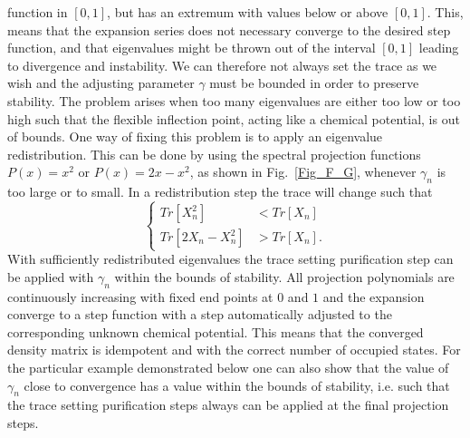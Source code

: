 \commentoutA{\documentclass[superbib,aps,prb,epsfig,floats,twocolumn]{revtex4}}
\begin{document}
function in $[0,1]$, but has an extremum with values below or above $[0,1]$.
This, means that the expansion series does not necessary converge
to the desired step function, and that eigenvalues might be thrown out
of the interval $[0,1]$ leading to divergence and instability.
We can therefore not always set the trace as we wish and
the adjusting parameter $\gamma$ must be bounded in order to preserve
stability. The problem arises when too many eigenvalues are
either too low or too high such that the flexible inflection
point, acting like a chemical potential, is out of bounds.
One way of fixing this problem is to apply an eigenvalue
redistribution. This can be done by using the spectral
projection functions  $P(x) = x^2$
or $P(x) = 2x-x^2$, as shown in Fig.\ \ref{Fig_F_G}, whenever $\gamma_n$ is 
too large or to small. In a redistribution step the trace will change 
such that
\begin{equation}
\left \{ \begin{array}{ll}
Tr[X_n^2] & < Tr[X_n]\\
Tr[2X_n-X_n^2] & > Tr[X_n].
\end{array} \right.
\end{equation}
With sufficiently
redistributed eigenvalues the trace setting purification
step can be applied with $\gamma_n$ within
the bounds of stability. All projection
polynomials are continuously increasing with fixed end
points at $0$ and $1$ and the expansion converge
to a step function with a step automatically adjusted to
the corresponding unknown chemical potential. This means
that the converged density matrix is idempotent and with
the correct number of occupied states. For the particular
example demonstrated below one can also show that the
value of $\gamma_n$ close to convergence has a value within
the bounds of stability, i.e. such that the trace setting
purification steps always can be applied at the final projection steps.
\end{document}
